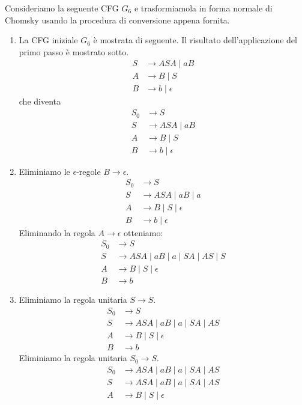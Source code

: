 \documentclass[12pt]{report}
\begin{document}
\begin{example}{}{}
Consideriamo la seguente CFG $G_6$ e trasformiamola in forma normale di Chomsky usando la procedura di conversione appena fornita.
\begin{enumerate}
	\item La CFG iniziale $G_6$ è mostrata di seguente. Il risultato dell'applicazione del primo passo è mostrato sotto.
	\begin{align*}
		S &\to ASA \mid aB \\
		A &\to B \mid S \\
		B &\to b \mid \epsilon
	\end{align*}
	che diventa
	\begin{align*}
		S_0 &\to S \\
		S &\to ASA \mid aB \\
		A &\to B \mid S \\
		B &\to b \mid \epsilon
	\end{align*}
	\item Eliminiamo le $\epsilon$-regole $B \to \epsilon$.
	\begin{align*}
		S_0 &\to S \\
		S &\to ASA \mid aB \mid a \\
		A &\to B \mid S \mid \epsilon  \\
		B &\to b \mid \epsilon
	\end{align*}
	Eliminando la regola $A \to \epsilon$ otteniamo:
	\begin{align*}
		S_0 &\to S \\
		S &\to ASA \mid aB \mid a \mid SA \mid AS \mid S \\
		A &\to B \mid S \mid \epsilon \\
		B &\to b
	\end{align*}
	\item Eliminiamo la regola unitaria $S \to S$.
	\begin{align*}
		S_0 &\to S \\
		S &\to ASA \mid aB \mid a \mid SA \mid AS \\
		A &\to B \mid S \mid \epsilon \\
		B &\to b
	\end{align*}
	Eliminiamo la regola unitaria $S_0 \to S$.
	\begin{align*}
		S_0 &\to ASA \mid aB \mid a \mid SA \mid AS \\
		S &\to ASA \mid aB \mid a \mid SA \mid AS \\
		A &\to B \mid S \mid \epsilon \\

\end{align*}
\end{enumerate}
\end{example}
\end{document}
